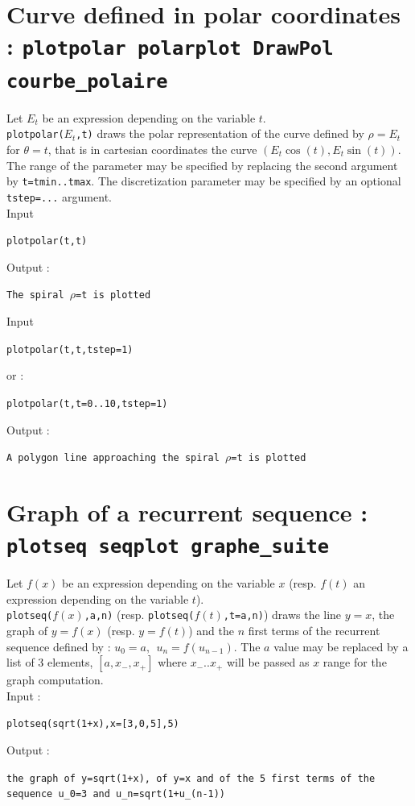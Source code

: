 \documentclass[a4paper,11pt]{book}
\begin{document}
\section{Curve defined in polar coordinates : {\tt plotpolar polarplot DrawPol courbe\_polaire}}
\noindent Let $E_t$ be an expression depending on the variable $t$.\\
{\tt plotpolar($E_t$,t)} draws the polar representation of the
curve defined by $\rho=E_t$ for $\theta=t$, that is
in cartesian coordinates the curve $(E_t \cos(t),E_t \sin(t))$.
The range of the parameter may be specified by replacing the second argument
by {\tt t=tmin..tmax}. The discretization parameter may be specified
by an optional {\tt tstep=...} argument.\\
Input 
\begin{center}{\tt  plotpolar(t,t)}\end{center}
Output :
\begin{center}{\tt The spiral $\rho$=t is plotted}\end{center}
Input
\begin{center}{\tt  plotpolar(t,t,tstep=1)}\end{center}
or :
\begin{center}{\tt  plotpolar(t,t=0..10,tstep=1)}\end{center}
Output :
\begin{center}{\tt A polygon line approaching the spiral $\rho$=t is plotted}\end{center}

\section{Graph of a recurrent sequence : {\tt plotseq seqplot graphe\_suite}}\label{sec:plotseq}
\noindent Let $f(x)$ be an expression depending on the variable $x$ 
(resp. $f(t)$ an expression depending on the variable $t$).\\
{\tt plotseq($f(x)$,a,n)} (resp. {\tt plotseq($f(t)$,t=a,n)}) draws the line 
$y=x$, the graph of $y=f(x)$ (resp. $y=f(t)$) and the $n$ first terms of the
recurrent sequence defined by : $u_0=a,\ \ u_n=f(u_{n-1})$.
The $a$ value may be replaced by a list of 3 elements, $[a,x_-,x_+]$
where $x_-..x_+$ will be passed as $x$ range for the graph computation.\\ 
Input :
\begin{center}{\tt plotseq(sqrt(1+x),x=[3,0,5],5)}\end{center}
Output :
\begin{center}{\tt the graph of y=sqrt(1+x), of y=x and of the 5 first terms of the sequence u\_0=3 and u\_n=sqrt(1+u\_(n-1))}\end{center}
\end{document}
